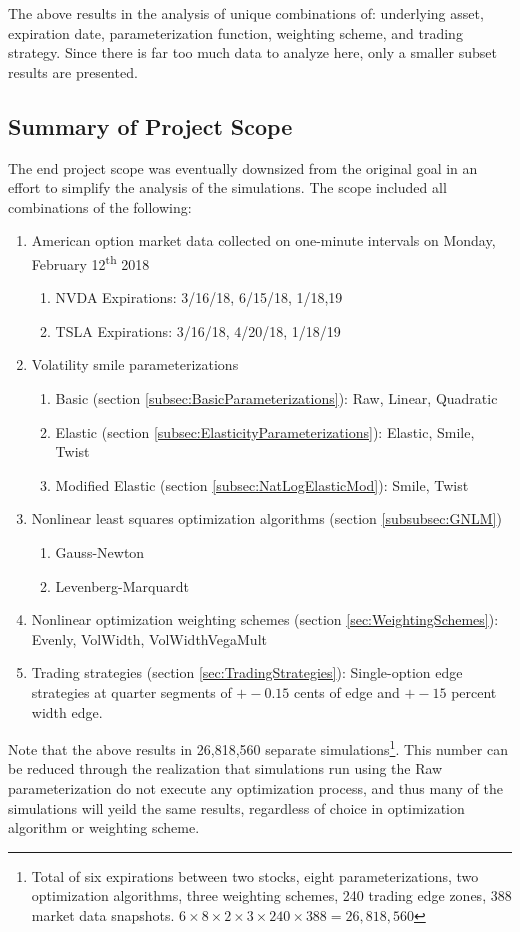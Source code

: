 \documentclass[12pt, a4paper, notitlepage]{article}
\numberwithin{equation}{subsection}
\numberwithin{figure}{subsection}
\numberwithin{table}{subsection}
\begin{document}
The above results in the analysis of unique combinations of: underlying asset, expiration date, parameterization function, weighting scheme, and trading strategy.  Since there is far too much data to analyze here, only a smaller subset results are presented.

\subsection{Summary of Project Scope}
The end project scope was eventually downsized from the original goal in an effort to simplify the analysis of the simulations. The scope included all combinations of the following:

\begin{enumerate}
    \item American option market data collected on one-minute intervals on Monday, February 12\textsuperscript{th} 2018
    \begin{enumerate}
        \item NVDA Expirations:  3/16/18, 6/15/18, 1/18,19
        \item TSLA Expirations:  3/16/18, 4/20/18, 1/18/19
    \end{enumerate}
    \item Volatility smile parameterizations
    \begin{enumerate}
        \item Basic (section \ref{subsec:BasicParameterizations}):  Raw, Linear, Quadratic
        \item Elastic (section \ref{subsec:ElasticityParameterizations}): Elastic, Smile, Twist
        \item Modified Elastic (section \ref{subsec:NatLogElasticMod}): Smile, Twist
    \end{enumerate}
    \item Nonlinear least squares optimization algorithms (section \ref{subsubsec:GNLM})
    \begin{enumerate}
        \item Gauss-Newton
        \item Levenberg-Marquardt
    \end{enumerate}
    \item Nonlinear optimization weighting schemes (section \ref{sec:WeightingSchemes}): Evenly, VolWidth, VolWidthVegaMult
    \item Trading strategies (section \ref{sec:TradingStrategies}):  Single-option edge strategies at quarter segments of $+-0.15$ cents of edge and $+-15$ percent width edge.
\end{enumerate}
Note that the above results in 26,818,560 separate simulations\footnote{Total of six expirations between two stocks, eight parameterizations, two optimization algorithms, three weighting schemes, 240 trading edge zones, 388 market data snapshots.  $6 \times 8 \times 2 \times 3 \times 240 \times 388 = 26,818,560$}.  This number can be reduced through the realization that simulations run using the Raw parameterization do not execute any optimization process, and thus many of the simulations will yeild the same results, regardless of choice in optimization algorithm or weighting scheme.
\end{document}
